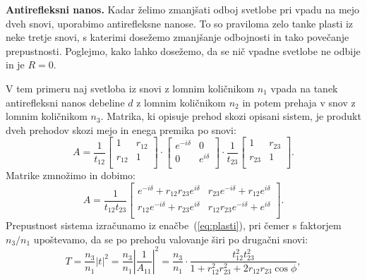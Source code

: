 \begin{example}{\bf Antirefleksni nanos.}
Kadar želimo zmanjšati odboj svetlobe pri vpadu na mejo dveh snovi, uporabimo
antirefleksne nanose. To so praviloma zelo tanke plasti iz neke tretje snovi, 
s katerimi dosežemo zmanjšanje odbojnosti in tako povečanje prepustnosti. Poglejmo, 
kako lahko dosežemo, da se nič vpadne svetlobe ne odbije in je $R=0$. 

V tem primeru naj svetloba iz snovi z lomnim količnikom $n_1$ vpada na tanek antirefleksni
nanos debeline $d$ z lomnim količnikom $n_2$ in potem prehaja v snov z lomnim količnikom 
$n_3$. Matrika, ki opisuje prehod skozi opisani sistem, je produkt dveh prehodov skozi
mejo in enega premika po snovi:
\begin{equation}
A = 
\frac{1}{t_{12}}
\left[\begin{array}{cc}
1& r_{12}\\
r_{12}& 1\\
\end{array}\right]\cdot
\left[\begin{array}{cc}
e^{-i\delta}& 0\\
0& e^{i\delta}\\
\end{array}\right]\cdot
\frac{1}{t_{23}}
\left[\begin{array}{cc}
1& r_{23}\\
r_{23}& 1\\
\end{array}\right]\!\!.
\label{eq:06_70}
\end{equation}
Matrike zmnožimo in dobimo:
\begin{equation}
A =
\frac{1}{t_{12}t_{23}}
\left[\begin{array}{cc}
e^{-i\delta}+r_{12}r_{23}e^{i\delta}& r_{23}e^{-i\delta}+r_{12}e^{i\delta} \\
r_{12}e^{-i\delta}+r_{23}e^{i\delta} & r_{12}r_{23}e^{-i\delta}+ e^{i\delta}\\
\end{array}\right]\!\!.
\label{eq:06_71}
\end{equation}
Prepustnost sistema izračunamo iz enačbe~(\ref{eq:plasti}), pri čemer s faktorjem $n_3/n_1$ 
upoštevamo, da se po prehodu valovanje širi po drugačni snovi:
\begin{equation}
T =\frac{n_3}{n_1} |t|^2 = \frac{n_3}{n_1} \left\rvert \frac{1}{A_{11}}\right\rvert^2 = 
\frac{n_3}{n_1} \cdot  \frac{t_{12}^2t_{23}^2}{1+ r_{12}^2r_{23}^2+2r_{12}r_{23}\cos\phi},
\label{eq:06_72}
\end{equation}

\end{example}

